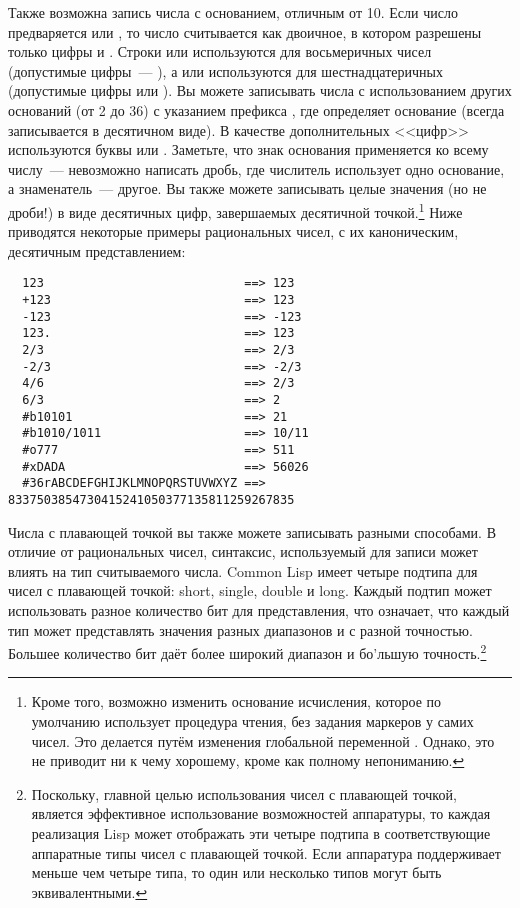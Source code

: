 Также возможна запись числа с основанием, отличным от 10.  Если число предваряется
 или , то число считывается как двоичное, в котором разрешены только
цифры  и .  Строки  или  используются для восьмеричных
чисел (допустимые цифры~--- ), а  или  используются для
шестнадцатеричных (допустимые цифры  или ).  Вы можете записывать
числа с использованием других оснований (от 2 до 36) с указанием префикса , где
 определяет основание (всегда записывается в десятичном виде).  В качестве
дополнительных <<цифр>> используются буквы  или .  Заметьте, что знак
основания применяется ко всему числу~--- невозможно написать дробь, где числитель
использует одно основание, а знаменатель~--- другое.  Вы также можете записывать целые
значения (но не дроби!) в виде десятичных цифр, завершаемых десятичной
точкой.\footnote{Кроме того, возможно изменить основание исчисления, которое по умолчанию
  использует процедура чтения, без задания маркеров у самих чисел. Это делается путём
  изменения глобальной переменной .  Однако, это не приводит ни к чему
  хорошему, кроме как полному непониманию.}  Ниже приводятся некоторые примеры
рациональных чисел, с их каноническим, десятичным представлением:

\begin{verbatim}
  123                            ==> 123
  +123                           ==> 123
  -123                           ==> -123
  123.                           ==> 123
  2/3                            ==> 2/3
  -2/3                           ==> -2/3
  4/6                            ==> 2/3
  6/3                            ==> 2
  #b10101                        ==> 21
  #b1010/1011                    ==> 10/11
  #o777                          ==> 511
  #xDADA                         ==> 56026
  #36rABCDEFGHIJKLMNOPQRSTUVWXYZ ==> 8337503854730415241050377135811259267835
\end{verbatim}

Числа с плавающей точкой вы также можете записывать разными способами.  В отличие от
рациональных чисел, синтаксис, используемый для записи может влиять на тип считываемого
числа.  Common Lisp имеет четыре подтипа для чисел с плавающей точкой: short, single,
double и long.  Каждый подтип может использовать разное количество бит для представления,
что означает, что каждый тип может представлять значения разных диапазонов и с разной
точностью.  Большее количество бит даёт более широкий диапазон и бо'льшую
точность.\footnote{Поскольку, главной целью использования чисел с плавающей точкой,
  является эффективное использование возможностей аппаратуры, то каждая реализация Lisp
  может отображать эти четыре подтипа в соответствующие аппаратные типы чисел с плавающей
  точкой.  Если аппаратура поддерживает меньше чем четыре типа, то один или несколько
  типов могут быть эквивалентными.}

